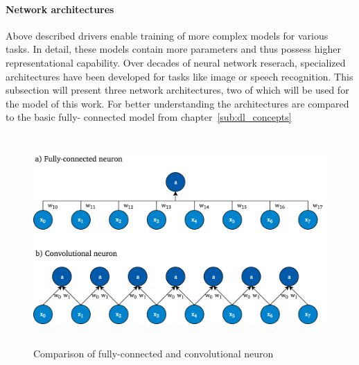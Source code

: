 \paragraph{Network architectures}
\label{sub:dl_architectures}

Above described drivers enable training of more complex models for various
tasks.
In detail, these models contain more parameters and thus possess higher
representational capability.
Over decades of neural network reserach, specialized architectures have been
developed for tasks like image or speech recognition.
This subsection will present three network architectures, two of which will
be used for the model of this work.
For better understanding the architectures are compared to the basic fully-
connected model from chapter~\ref{sub:dl_concepts}

\begin{figure}[h]
  \centering
  \includegraphics[height=8cm]{img/conv_layer.png}
  \caption{Comparison of fully-connected and convolutional neuron}
\label{fig:conv_layer}
\end{figure}

